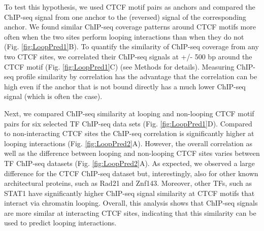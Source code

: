 \documentclass[a4paper,twoside=true,openright,parskip=full,chapterprefix=true,11pt,headings=normal,bibliography=totoc,listof=totoc,titlepage=on,captions=tableabove,draft=false]{scrreprt}
\theoremstyle{definition}
\theoremstyle{definition}
\theoremstyle{definition}
\theoremstyle{remark}
\begin{document}
To test this hypothesis, we used CTCF motif pairs as anchors and
compared the ChIP-seq signal from one anchor to the (reversed) signal of
the corresponding anchor. We found similar ChIP-seq coverage patterns
around CTCF motifs more often when the two sites perform looping
interactions than when they do not (Fig. \ref{fig:LoopPred1}B). To
quantify the similarity of ChIP-seq coverage from any two CTCF sites, we
correlated their ChIP-seq signals at +/- 500 bp around the CTCF motif
(Fig. \ref{fig:LoopPred1}C) (see Methods for details). Measuring
ChIP-seq profile similarity by correlation has the advantage that the
correlation can be high even if the anchor that is not bound directly
has a much lower ChIP-seq signal (which is often the case).

Next, we compared ChIP-seq similarity at looping and non-looping CTCF
motif pairs for six selected TF ChIP-seq data sets (Fig.
\ref{fig:LoopPred1}D). Compared to non-interacting CTCF sites the
ChIP-seq correlation is significantly higher at looping interactions
(Fig. \ref{fig:LoopPred2}A). However, the overall correlation as well as
the difference between looping and non-looping CTCF sites varies between
TF ChIP-seq datasets (Fig. \ref{fig:LoopPred2}A). As expected, we
observed a large difference for the CTCF ChIP-seq dataset but,
interestingly, also for other known architectural proteins, such as
Rad21 and Znf143. Moreover, other TFs, such as STAT1 have significantly
higher ChIP-seq signal similarity at CTCF motifs that interact via
chromatin looping. Overall, this analysis shows that ChIP-seq signals
are more similar at interacting CTCF sites, indicating that this
similarity can be used to predict looping interactions.
\end{document}

